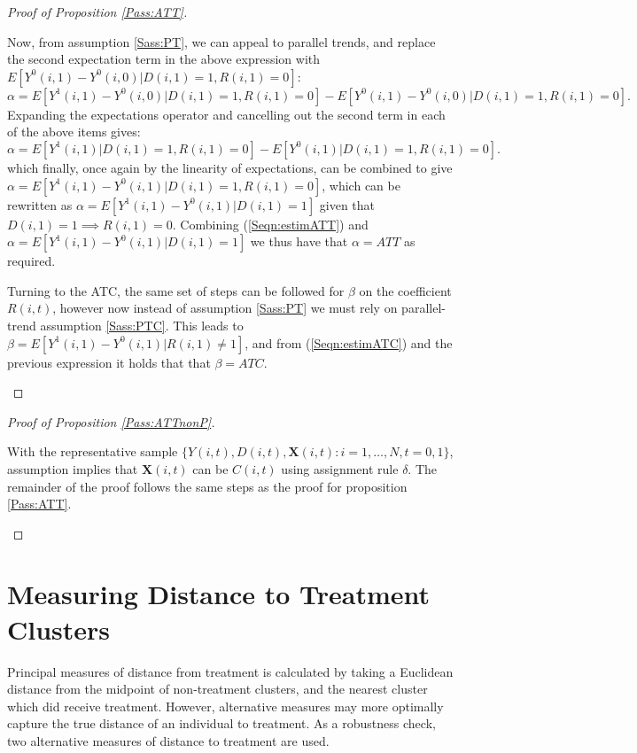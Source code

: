\begin{proof}[Proof of Proposition \ref{Pass:ATT}]
\begin{footnotesize}
Now, from assumption \ref{Sass:PT}, we can appeal to parallel trends, and 
replace the second expectation term in the above expression with $E
[Y^0(i,1)-Y^0(i,0)|D(i,1)=1,R(i,1)=0]$:
\begin{equation}
\nonumber
\label{Seqn:alphaProof4}
\alpha=E[Y^1(i,1)-Y^0(i,0)|D(i,1)=1,R(i,1)=0] - E[Y^0(i,1)-Y^0(i,0)|D(i,1)=1,R(i,1)=0].
\end{equation}
Expanding the expectations operator and cancelling out the second term in each of
the above items gives:
\begin{equation}
\nonumber
\label{Seqn:alphaProof5}
\alpha=E[Y^1(i,1)|D(i,1)=1,R(i,1)=0] - E[Y^0(i,1)|D(i,1)=1,R(i,1)=0].
\end{equation}
which finally, once again by the linearity of expectations, can be combined to 
give $\alpha=E[Y^1(i,1)-Y^0(i,1)|D(i,1)=1,R(i,1)=0]$, which can be 
rewritten as $\alpha=E[Y^1(i,1)-Y^0(i,1)|D(i,1)=1]$ given that 
$D(i,1)=1 \implies R(i,1)=0$.  Combining (\ref{Seqn:estimATT}) and $\alpha=
E[Y^1(i,1)-Y^0(i,1)|D(i,1)=1]$ we thus have that $\alpha=ATT$ as 
required.

Turning to the ATC, the same set of steps can be followed for $\beta$ on the 
coefficient $R(i,t)$, however now instead of assumption \ref{Sass:PT} we must
rely on parallel-trend assumption \ref{Sass:PTC}. This leads to $\beta=
E[Y^1(i,1)-Y^0(i,1)|R(i,1)\neq 1]$, and from (\ref{Seqn:estimATC}) 
and the previous expression it holds that that $\beta=ATC$.
\end{footnotesize}
\end{proof}

\begin{proof}[Proof of Proposition \ref{Pass:ATTnonP}]
\begin{footnotesize}
With the representative sample $\{Y(i,t), D(i,t), \mathbf{X}(i,t): i=1, \ldots, N, 
t=0, 1\}$, assumption  implies that $\mathbf{X}(i,t)$ can
be $C(i,t)$ using assignment rule $\delta$.  The remainder of the proof follows
the same steps as the proof for proposition \ref{Pass:ATT}.
\end{footnotesize}
\end{proof}

\clearpage
\section{Measuring Distance to Treatment Clusters}
Principal measures of distance from treatment is calculated by taking a 
Euclidean distance from the midpoint of non-treatment clusters, and the nearest
cluster which did receive treatment.  However, alternative measures may more
optimally capture the true distance of an individual to treatment.  As a 
robustness check, two alternative measures of distance to treatment are used.

